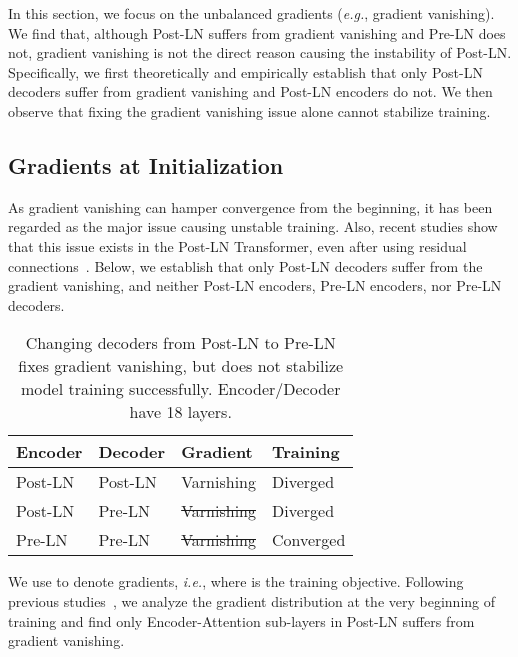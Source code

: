 \documentclass[11pt,a4paper]{article}
\newcommand{\soutthick}[1]{\st{#1}}
\newcommand{\eg}{\textit{e.g.}}
\newcommand{\ie}{\textit{i.e.}}
\begin{document}
In this section, we focus on the unbalanced gradients (\eg, gradient vanishing). 
We find that, although 
Post-LN suffers from gradient vanishing and Pre-LN does not, 
gradient vanishing is not the direct reason causing the instability of Post-LN. 
Specifically, we first theoretically and empirically establish that only Post-LN decoders suffer from gradient vanishing and Post-LN encoders do not.
We then observe that fixing the gradient vanishing issue alone cannot stabilize training.


\subsection{Gradients at Initialization}
\label{subsec:ini_grad}

As gradient vanishing can hamper convergence from the beginning, it has been regarded as the major issue causing unstable training. 
Also, recent studies show that this issue exists in the Post-LN Transformer, even after using residual connections~\cite{Xiong2019OnLN}. 
Below, we establish that only Post-LN decoders suffer from the gradient vanishing, and neither Post-LN encoders, Pre-LN encoders, nor Pre-LN decoders. 

\begin{table}[t]
\begin{center}
\small
\vspace{0.4cm}
\begin{tabularx}{\linewidth}{ *{4}{Y}}
\toprule
\textbf{Encoder} & \textbf{Decoder} & \textbf{Gradient} & \textbf{Training} \\ \midrule
Post-LN & Post-LN & Varnishing & Diverged \\
Post-LN & Pre-LN & \soutthick{Varnishing} & Diverged \\
Pre-LN & Pre-LN & \soutthick{Varnishing} & Converged \\
\bottomrule
\end{tabularx}
\end{center}
\caption{Changing decoders from Post-LN to Pre-LN fixes gradient vanishing, but does not stabilize model training successfully. Encoder/Decoder have 18 layers.}
\label{tbl:fixing-gradient-vanishing}
\end{table}

We use  to denote gradients, \ie,  where  is the training objective. 
Following previous studies~\cite{Glorot2010UnderstandingTD},
we analyze the gradient distribution at the very beginning of training and find only Encoder-Attention sub-layers in Post-LN suffers from gradient vanishing.  
\end{document}
